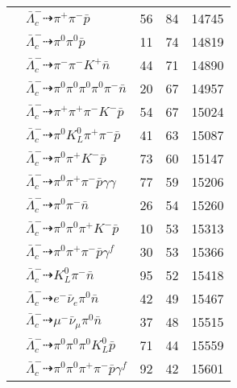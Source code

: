 \documentclass[landscape]{article}
\newcounter{rownumbers}
\newcommand\rn{\stepcounter{rownumbers}\arabic{rownumbers}}
\newcommand{\EOL}{\\} %
\newcommand{\topoTags}[1]{#1} %
\begin{document}
\begin{longtable}{clccc}
\rn & $ \bar{\Lambda}_{c}^{-} \dashrightarrow \pi^{+} \pi^{-} \bar{p} $ & \topoTags{56 & }84 & 14745 \EOL

\rn & $ \bar{\Lambda}_{c}^{-} \dashrightarrow \pi^{0} \pi^{0} \bar{p} $ & \topoTags{11 & }74 & 14819 \EOL

\rn & $ \bar{\Lambda}_{c}^{-} \dashrightarrow \pi^{-} \pi^{-} K^{+} \bar{n} $ & \topoTags{44 & }71 & 14890 \EOL

\rn & $ \bar{\Lambda}_{c}^{-} \dashrightarrow \pi^{0} \pi^{0} \pi^{0} \pi^{0} \pi^{-} \bar{n} $ & \topoTags{20 & }67 & 14957 \EOL

\rn & $ \bar{\Lambda}_{c}^{-} \dashrightarrow \pi^{+} \pi^{+} \pi^{-} K^{-} \bar{p} $ & \topoTags{54 & }67 & 15024 \EOL

\rn & $ \bar{\Lambda}_{c}^{-} \dashrightarrow \pi^{0} K_{L}^{0} \pi^{+} \pi^{-} \bar{p} $ & \topoTags{41 & }63 & 15087 \EOL

\rn & $ \bar{\Lambda}_{c}^{-} \dashrightarrow \pi^{0} \pi^{+} K^{-} \bar{p} $ & \topoTags{73 & }60 & 15147 \EOL

\rn & $ \bar{\Lambda}_{c}^{-} \dashrightarrow \pi^{0} \pi^{+} \pi^{-} \bar{p} \gamma \gamma $ & \topoTags{77 & }59 & 15206 \EOL

\rn & $ \bar{\Lambda}_{c}^{-} \dashrightarrow \pi^{0} \pi^{-} \bar{n} $ & \topoTags{26 & }54 & 15260 \EOL

\rn & $ \bar{\Lambda}_{c}^{-} \dashrightarrow \pi^{0} \pi^{0} \pi^{+} K^{-} \bar{p} $ & \topoTags{10 & }53 & 15313 \EOL

\rn & $ \bar{\Lambda}_{c}^{-} \dashrightarrow \pi^{0} \pi^{+} \pi^{-} \bar{p} \gamma^{f} $ & \topoTags{30 & }53 & 15366 \EOL

\rn & $ \bar{\Lambda}_{c}^{-} \dashrightarrow K_{L}^{0} \pi^{-} \bar{n} $ & \topoTags{95 & }52 & 15418 \EOL

\rn & $ \bar{\Lambda}_{c}^{-} \dashrightarrow e^{-} \bar{\nu}_{e} \pi^{0} \bar{n} $ & \topoTags{42 & }49 & 15467 \EOL

\rn & $ \bar{\Lambda}_{c}^{-} \dashrightarrow \mu^{-} \bar{\nu}_{\mu} \pi^{0} \bar{n} $ & \topoTags{37 & }48 & 15515 \EOL

\rn & $ \bar{\Lambda}_{c}^{-} \dashrightarrow \pi^{0} \pi^{0} \pi^{0} K_{L}^{0} \bar{p} $ & \topoTags{71 & }44 & 15559 \EOL

\rn & $ \bar{\Lambda}_{c}^{-} \dashrightarrow \pi^{0} \pi^{0} \pi^{+} \pi^{-} \bar{p} \gamma^{f} $ & \topoTags{92 & }42 & 15601 \EOL


\end{longtable}
\end{document}
